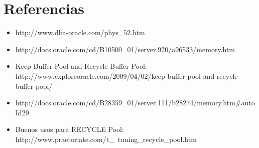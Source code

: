 \documentclass[10pt, a4paper,english,spanish]{article}
\begin{document}

\maketitle
\pagebreak

\tableofcontents
\pagebreak


\newpage


\newpage


\newpage

\section{Referencias}
\begin{itemize}
	\item http://www.dba-oracle.com/phys\_52.htm
	\item http://docs.oracle.com/cd/B10500\_01/server.920/a96533/memory.htm
	\item Keep Buffer Pool and Recycle Buffer Pool: \\ 
		http://www.exploreoracle.com/2009/04/02/keep-buffer-pool-and-recycle-buffer-pool/
	\item http://docs.oracle.com/cd/B28359\_01/server.111/b28274/memory.htm\#autoId29
	\item Buenos usos para RECYCLE Pool: \\
		http://www.praetoriate.com/t\_\ tuning\_recycle\_pool.htm
\end{itemize}
\end{document}

